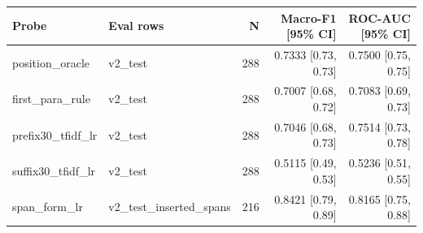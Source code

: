 \begin{tabular}{llrrr}
\toprule
\textbf{Probe} & \textbf{Eval rows} & \textbf{N} & \textbf{Macro-F1 [95\% CI]} & \textbf{ROC-AUC [95\% CI]} \\
\midrule
position\_oracle & v2\_test & 288 & 0.7333 {\scriptsize[0.73, 0.73]} & 0.7500 {\scriptsize[0.75, 0.75]} \\
first\_para\_rule & v2\_test & 288 & 0.7007 {\scriptsize[0.68, 0.72]} & 0.7083 {\scriptsize[0.69, 0.73]} \\
prefix30\_tfidf\_lr & v2\_test & 288 & 0.7046 {\scriptsize[0.68, 0.73]} & 0.7514 {\scriptsize[0.73, 0.78]} \\
suffix30\_tfidf\_lr & v2\_test & 288 & 0.5115 {\scriptsize[0.49, 0.53]} & 0.5236 {\scriptsize[0.51, 0.55]} \\
span\_form\_lr & v2\_test\_inserted\_spans & 216 & 0.8421 {\scriptsize[0.79, 0.89]} & 0.8165 {\scriptsize[0.75, 0.88]} \\
\bottomrule
\end{tabular}
